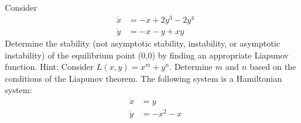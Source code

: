 \documentclass{exam}
\begin{document}
\begin{questions}
    \question[10]
        Consider
        \begin{equation*}
            \begin{aligned}
                \dot{x} &= -x + 2y^3 - 2y^4\\
                \dot{y} &= -x-y+xy
            \end{aligned}
        \end{equation*}
        Determine the stability (not asymptotic stability, instability, or asymptotic instability) of the equilibrium point (0,0) by finding an appropriate Liapunov function. 
        Hint: Consider $L(x,y) = x^m + y^n$. Determine $m$ and $n$ based on the conditions of the Liapunov theorem.
    \question[20]
        The following system is a Hamiltonian system:
        \begin{equation*}
            \begin{aligned}
                \dot{x} &= y\\
                \dot{y} &= -x^2 - x
            \end{aligned}
        \end{equation*}
\end{questions}
\end{document}
